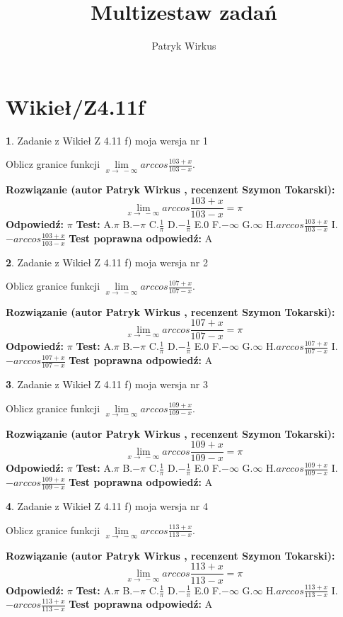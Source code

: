 \documentclass[12pt, a4paper]{article}
\title{Multizestaw zadań}
\author{Patryk Wirkus}
\date{}
\theoremstyle{definition} %
\newtheorem{zad}{}
\newcommand{\kategoria}[1]{\section{#1}}
\newcommand{\zadStart}[1]{\begin{zad}#1\newline}
\newcommand{\zadStop}{\end{zad}}
\newcommand{\rozwStart}[2]{\noindent \textbf{Rozwiązanie (autor #1 , recenzent #2): }\newline}
\newcommand{\rozwStop}{\newline}
\newcommand{\odpStart}{\noindent \textbf{Odpowiedź:}\newline}
\newcommand{\odpStop}{\newline}
\newcommand{\testStart}{\noindent \textbf{Test:}\newline}
\newcommand{\testStop}{\newline}
\newcommand{\kluczStart}{\noindent \textbf{Test poprawna odpowiedź:}\newline}
\newcommand{\kluczStop}{\newline}
\begin{document}
\maketitle

\kategoria{Wikieł/Z4.11f}


\zadStart{Zadanie z Wikieł Z 4.11 f) moja wersja nr 1}

Oblicz granice funkcji $\lim\limits_{x\to\ -\infty}arccos\frac{103+x}{103-x}$.
\zadStop
\rozwStart{Patryk Wirkus}{Szymon Tokarski}
$$\lim\limits_{x\to\ -\infty}arccos\frac{103+x}{103-x} = \pi$$
\rozwStop
\odpStart
$\pi$
\odpStop
\testStart
A.$\pi$ B.$-\pi$ C.$\frac{1}{\pi}$ D.$-\frac{1}{\pi}$ E.$0$ F.$-\infty$ G.$\infty$ H.$arccos\frac{103+x}{103-x}$ I.$-arccos\frac{103+x}{103-x}$
\testStop
\kluczStart
A
\kluczStop



\zadStart{Zadanie z Wikieł Z 4.11 f) moja wersja nr 2}

Oblicz granice funkcji $\lim\limits_{x\to\ -\infty}arccos\frac{107+x}{107-x}$.
\zadStop
\rozwStart{Patryk Wirkus}{Szymon Tokarski}
$$\lim\limits_{x\to\ -\infty}arccos\frac{107+x}{107-x} = \pi$$
\rozwStop
\odpStart
$\pi$
\odpStop
\testStart
A.$\pi$ B.$-\pi$ C.$\frac{1}{\pi}$ D.$-\frac{1}{\pi}$ E.$0$ F.$-\infty$ G.$\infty$ H.$arccos\frac{107+x}{107-x}$ I.$-arccos\frac{107+x}{107-x}$
\testStop
\kluczStart
A
\kluczStop



\zadStart{Zadanie z Wikieł Z 4.11 f) moja wersja nr 3}

Oblicz granice funkcji $\lim\limits_{x\to\ -\infty}arccos\frac{109+x}{109-x}$.
\zadStop
\rozwStart{Patryk Wirkus}{Szymon Tokarski}
$$\lim\limits_{x\to\ -\infty}arccos\frac{109+x}{109-x} = \pi$$
\rozwStop
\odpStart
$\pi$
\odpStop
\testStart
A.$\pi$ B.$-\pi$ C.$\frac{1}{\pi}$ D.$-\frac{1}{\pi}$ E.$0$ F.$-\infty$ G.$\infty$ H.$arccos\frac{109+x}{109-x}$ I.$-arccos\frac{109+x}{109-x}$
\testStop
\kluczStart
A
\kluczStop



\zadStart{Zadanie z Wikieł Z 4.11 f) moja wersja nr 4}

Oblicz granice funkcji $\lim\limits_{x\to\ -\infty}arccos\frac{113+x}{113-x}$.
\zadStop
\rozwStart{Patryk Wirkus}{Szymon Tokarski}
$$\lim\limits_{x\to\ -\infty}arccos\frac{113+x}{113-x} = \pi$$
\rozwStop
\odpStart
$\pi$
\odpStop
\testStart
A.$\pi$ B.$-\pi$ C.$\frac{1}{\pi}$ D.$-\frac{1}{\pi}$ E.$0$ F.$-\infty$ G.$\infty$ H.$arccos\frac{113+x}{113-x}$ I.$-arccos\frac{113+x}{113-x}$
\testStop
\kluczStart
A
\kluczStop
\end{document}
